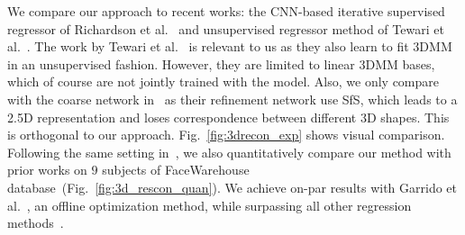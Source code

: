 We compare our approach to recent works: the CNN-based iterative supervised regressor of Richardson et al.~\cite{richardson20163d, richardson2017learning} and unsupervised regressor method of Tewari et al.~\cite{tewari2017mofa}.
The work by Tewari et al.~\cite{tewari2017mofa} is relevant to us as they also learn to fit 3DMM in an unsupervised fashion. 
However, they are limited to linear 3DMM bases, which of course are not jointly trained with the model. 
Also, we only compare with the coarse network in~\cite{richardson2017learning} as their refinement network use SfS, which leads to a 2.5D representation and loses correspondence between different 3D shapes. 
This is orthogonal to our approach.
Fig.~\ref{fig:3drecon_exp} shows visual comparison. 
Following the same setting in~\cite{tewari2017mofa}, we also quantitatively compare our method with prior works on $9$ subjects of FaceWarehouse database~(Fig.~\ref{fig:3d_rescon_quan}). 
We achieve on-par results with Garrido et al.~\cite{garrido2016reconstruction}, an offline optimization method, while surpassing all other regression methods~\cite{tran2017regressing, richardson2017learning, tewari2017mofa}.


